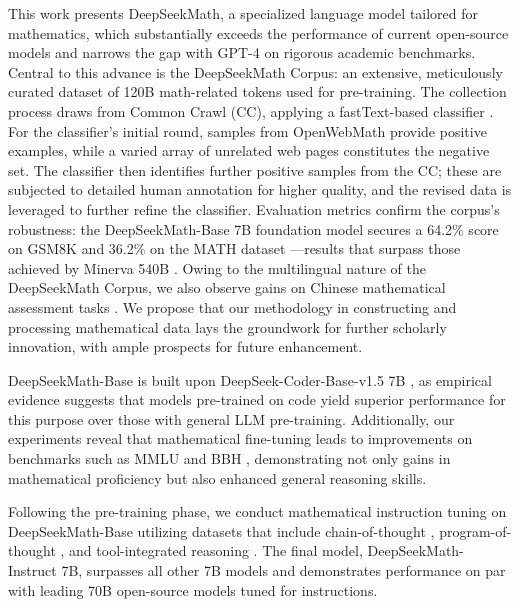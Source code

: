 This work presents DeepSeekMath, a specialized language model tailored for mathematics, which substantially exceeds the performance of current open-source models and narrows the gap with GPT-4 on rigorous academic benchmarks. Central to this advance is the DeepSeekMath Corpus: an extensive, meticulously curated dataset of 120B math-related tokens used for pre-training. The collection process draws from Common Crawl (CC), applying a fastText-based classifier \citep{joulin2016fasttext}. For the classifier’s initial round, samples from OpenWebMath \citep{openwebmath} provide positive examples, while a varied array of unrelated web pages constitutes the negative set. The classifier then identifies further positive samples from the CC; these are subjected to detailed human annotation for higher quality, and the revised data is leveraged to further refine the classifier. Evaluation metrics confirm the corpus’s robustness: the DeepSeekMath-Base 7B foundation model secures a 64.2\% score on GSM8K \citep{gsm8k} and 36.2\% on the MATH dataset \citep{MATH}—results that surpass those achieved by Minerva 540B \citep{minerva}. Owing to the multilingual nature of the DeepSeekMath Corpus, we also observe gains on Chinese mathematical assessment tasks \citep{wei2023cmath,agieval}. We propose that our methodology in constructing and processing mathematical data lays the groundwork for further scholarly innovation, with ample prospects for future enhancement.

DeepSeekMath-Base is built upon DeepSeek-Coder-Base-v1.5 7B \citep{deepseek-coder}, as empirical evidence suggests that models pre-trained on code yield superior performance for this purpose over those with general LLM pre-training. Additionally, our experiments reveal that mathematical fine-tuning leads to improvements on benchmarks such as MMLU \citep{mmlu} and BBH \citep{bbh}, demonstrating not only gains in mathematical proficiency but also enhanced general reasoning skills.

Following the pre-training phase, we conduct mathematical instruction tuning on DeepSeekMath-Base utilizing datasets that include chain-of-thought \citep{cot}, program-of-thought \citep{pot,pal}, and tool-integrated reasoning \citep{tora}. The final model, DeepSeekMath-Instruct 7B, surpasses all other 7B models and demonstrates performance on par with leading 70B open-source models tuned for instructions.

